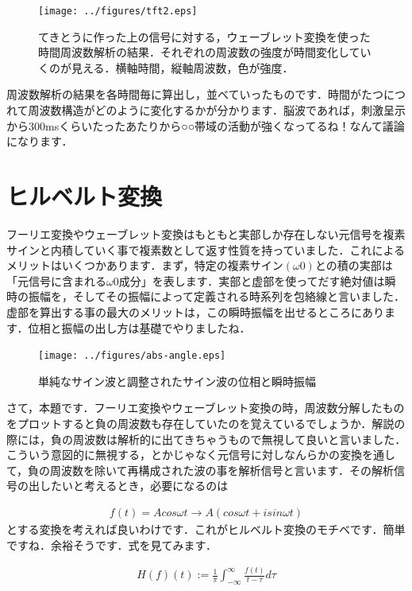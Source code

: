 \documentclass[11pt,a4paper]{ujreport} 	%
\begin{document}
\begin{figure}[H]
  \centering
  \texttt{[image: ../figures/tft2.eps]}
  \caption{てきとうに作った上の信号に対する，ウェーブレット変換を使った時間周波数解析の結果．それぞれの周波数の強度が時間変化していくのが見える．横軸時間，縦軸周波数，色が強度．}
\end{figure}

周波数解析の結果を各時間毎に算出し，並べていったものです．時間がたつにつれて周波数構造がどのように変化するかが分かります．脳波であれば，刺激呈示から300msくらいたったあたりから○○帯域の活動が強くなってるね！なんて議論になります．

\chapter{ヒルベルト変換}
フーリエ変換やウェーブレット変換はもともと実部しか存在しない元信号を複素サインと内積していく事で複素数として返す性質を持っていました．これによるメリットはいくつかあります．まず，特定の複素サイン$(\omega 0)$との積の実部は「元信号に含まれる$\omega 0$成分」を表します．実部と虚部を使ってだす絶対値は瞬時の振幅を，そしてその振幅によって定義される時系列を包絡線と言いました．\\

虚部を算出する事の最大のメリットは，この瞬時振幅を出せるところにあります．位相と振幅の出し方は基礎でやりましたね．

\begin{figure}[H]
  \centering
  \texttt{[image: ../figures/abs-angle.eps]}
  \caption{単純なサイン波と調整されたサイン波の位相と瞬時振幅}
\end{figure}

さて，本題です．フーリエ変換やウェーブレット変換の時，周波数分解したものをプロットすると負の周波数も存在していたのを覚えているでしょうか．解説の際には，負の周波数は解析的に出てきちゃうもので無視して良いと言いました．こういう意図的に無視する，とかじゃなく元信号に対しなんらかの変換を通して，負の周波数を除いて再構成された波の事を解析信号と言います．その解析信号の出したいと考えるとき，必要になるのは


\begin{eqnarray}
  f(t) = Acos\omega t\rightarrow A(cos\omega t + i sin\omega t)
\end{eqnarray}
とする変換を考えれば良いわけです．これがヒルベルト変換のモチベです．簡単ですね．余裕そうです．式を見てみます．


\begin{eqnarray}
  \label{eq:hilbert1}
  H(f)(t):= \frac{1}{\pi} \int_{-\infty}^\infty \frac{f(t)}{t-\tau} d\tau
\end{eqnarray}
\end{document}
